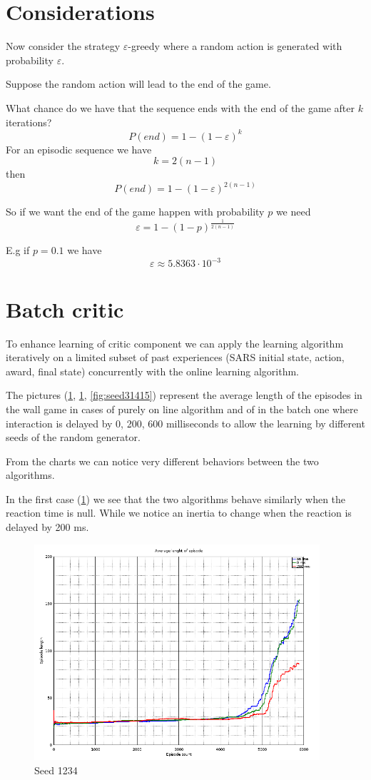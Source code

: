 \documentclass[a4paper,11pt]{article}
\begin{document}
\section{Considerations}

Now consider the strategy $ \varepsilon $-greedy where a random action is generated with probability $ \varepsilon $.

Suppose the random action will lead to the end of the game.

What chance do we have that the sequence ends with the end of the game after $ k $ iterations?
\[
P(end) = 1 - (1 - \varepsilon) ^ k
\]
For an episodic sequence we have 
\[ k = 2 (n-1) \]
then
\[
P(end) = 1 - (1 - \varepsilon) ^ {2(n-1)}
\]

So if we want the end of the game happen with probability $ p $ we need 
\[
\varepsilon = 1- (1 - p) ^ \frac{1}{2(n-1)}
\]

E.g if $ p = 0.1 $ we have
\[
\varepsilon \approx 5.8363 \cdot 10^{-3}
\]

\section{Batch critic}

To enhance learning of critic component we can apply
the learning algorithm iteratively on a limited subset
of past experiences (SARS initial state, action, award, final state)
concurrently with the online learning algorithm.

The pictures (\ref{fig:seed1234}, \ref{fig:seed1234}, \ref{fig:seed31415}) represent the average length of the episodes in
the wall game in cases of purely on line algorithm  and
of in the batch one where interaction is delayed by 0, 200, 600 milliseconds
to allow the learning by different seeds of the random generator.

From the charts we can notice very different behaviors between the two algorithms.

In the first case (\ref{fig:seed1234}) we see that the two algorithms behave similarly when the reaction time is null.
While we notice an inertia to change when the reaction is delayed by 200 ms.

\begin{figure}
	\label{fig:seed1234}
	\includegraphics[width=300pt]{episodes-123}
	\caption{Seed 1234}
\end{figure}
\end{document}
